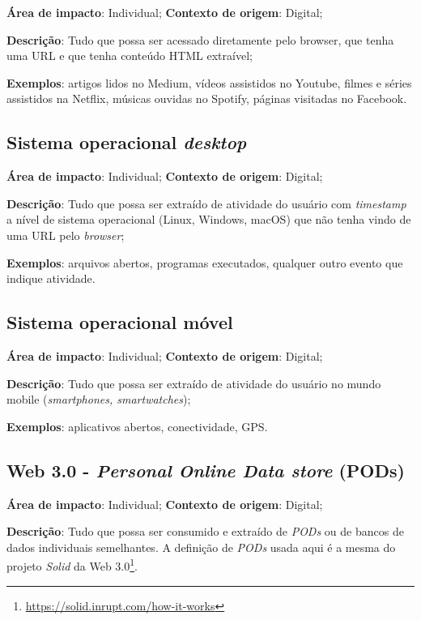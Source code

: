 \textbf{Área de impacto}: Individual; \textbf{Contexto de origem}: Digital;

\textbf{Descrição}: Tudo que possa ser acessado diretamente pelo browser, que tenha uma URL e que tenha conteúdo HTML extraível;

\textbf{Exemplos}: artigos lidos no Medium, vídeos assistidos no Youtube, filmes e séries assistidos na Netflix, músicas ouvidas no Spotify, páginas visitadas no Facebook.

\subsection{Sistema operacional \textit{desktop}}

\textbf{Área de impacto}: Individual; \textbf{Contexto de origem}: Digital;

\textbf{Descrição}: Tudo que possa ser extraído de atividade do usuário com \textit{timestamp} a nível de sistema operacional (Linux, Windows, macOS) que não tenha vindo de uma URL pelo \textit{browser};

\textbf{Exemplos}: arquivos abertos, programas executados, qualquer outro evento que indique atividade.

\subsection{Sistema operacional móvel}

\textbf{Área de impacto}: Individual; \textbf{Contexto de origem}: Digital;

\textbf{Descrição}: Tudo que possa ser extraído de atividade do usuário no mundo mobile (\textit{smartphones, smartwatches});

\textbf{Exemplos}: aplicativos abertos, conectividade, GPS.

\subsection{Web 3.0 - \textit{Personal Online Data store} (PODs)}

\textbf{Área de impacto}: Individual; \textbf{Contexto de origem}: Digital;

\textbf{Descrição}: Tudo que possa ser consumido e extraído de \textit{PODs} ou de bancos de dados individuais semelhantes. A definição de \textit{PODs} usada aqui é a mesma do projeto \textit{Solid} da Web 3.0\footnote{\url{https://solid.inrupt.com/how-it-works}}.

